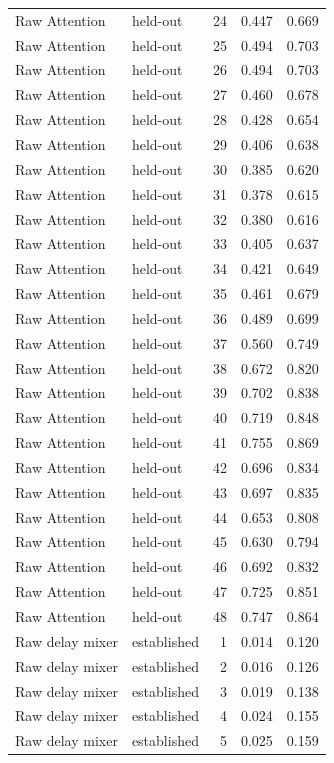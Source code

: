 \begin{tabular}{llrrr}
Raw Attention & held-out & 24 & 0.447 & 0.669 \\
Raw Attention & held-out & 25 & 0.494 & 0.703 \\
Raw Attention & held-out & 26 & 0.494 & 0.703 \\
Raw Attention & held-out & 27 & 0.460 & 0.678 \\
Raw Attention & held-out & 28 & 0.428 & 0.654 \\
Raw Attention & held-out & 29 & 0.406 & 0.638 \\
Raw Attention & held-out & 30 & 0.385 & 0.620 \\
Raw Attention & held-out & 31 & 0.378 & 0.615 \\
Raw Attention & held-out & 32 & 0.380 & 0.616 \\
Raw Attention & held-out & 33 & 0.405 & 0.637 \\
Raw Attention & held-out & 34 & 0.421 & 0.649 \\
Raw Attention & held-out & 35 & 0.461 & 0.679 \\
Raw Attention & held-out & 36 & 0.489 & 0.699 \\
Raw Attention & held-out & 37 & 0.560 & 0.749 \\
Raw Attention & held-out & 38 & 0.672 & 0.820 \\
Raw Attention & held-out & 39 & 0.702 & 0.838 \\
Raw Attention & held-out & 40 & 0.719 & 0.848 \\
Raw Attention & held-out & 41 & 0.755 & 0.869 \\
Raw Attention & held-out & 42 & 0.696 & 0.834 \\
Raw Attention & held-out & 43 & 0.697 & 0.835 \\
Raw Attention & held-out & 44 & 0.653 & 0.808 \\
Raw Attention & held-out & 45 & 0.630 & 0.794 \\
Raw Attention & held-out & 46 & 0.692 & 0.832 \\
Raw Attention & held-out & 47 & 0.725 & 0.851 \\
Raw Attention & held-out & 48 & 0.747 & 0.864 \\
Raw delay mixer & established & 1 & 0.014 & 0.120 \\
Raw delay mixer & established & 2 & 0.016 & 0.126 \\
Raw delay mixer & established & 3 & 0.019 & 0.138 \\
Raw delay mixer & established & 4 & 0.024 & 0.155 \\
Raw delay mixer & established & 5 & 0.025 & 0.159 \\

\end{tabular}
